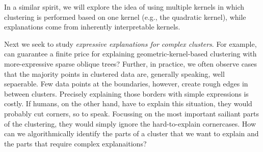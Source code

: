 \documentclass[a4paper,11pt]{article}
\begin{document}


\iffalse


In a similar spirit, we will explore the idea of using multiple kernels 
in which clustering is performed based on one kernel (e.g., the quadratic kernel), 
while explanations come from inherently interpretable kernels.

Next we seek to study \emph{expressive explanations for complex clusters}.
For example, can guarantee a finite price for explaining geometric-kernel-based clustering with more-expressive sparse oblique trees?
Further, in practice, we often observe cases that the majority points in clustered data are, generally speaking, well sepaerable.
Few data points at the boundaries, however, create rough edges in between clusters.
Precisely explaining those borders with simple expressions is costly.
If humans, on the other hand, have to explain this situation, they would probably cut corners, so to speak.
Focussing on the most important sailiant parts of the clustering, they would simply ignore the hard-to-explain cornercases.
How can we algorithmically identify the parts of a cluster that we want to explain and the parts that require complex explanaitions?
\end{document}
